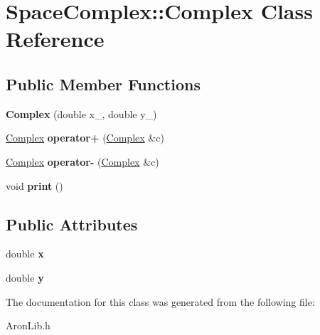 \hypertarget{class_space_complex_1_1_complex}{}\section{Space\+Complex\+:\+:Complex Class Reference}
\label{class_space_complex_1_1_complex}
\subsection*{Public Member Functions}
\begin{DoxyCompactItemize}
\item 
\mbox{\label{class_space_complex_1_1_complex_a366b06ac1e3a9e6d41494fdc91ab8e0e}} 
{\bfseries Complex} (double x\+\_\+, double y\+\_\+)
\item 
\mbox{\label{class_space_complex_1_1_complex_aea42c3fb8920152900502ef380b78225}} 
\mbox{\hyperlink{class_space_complex_1_1_complex}{Complex}} {\bfseries operator+} (\mbox{\hyperlink{class_space_complex_1_1_complex}{Complex}} \&c)
\item 
\mbox{\label{class_space_complex_1_1_complex_a50f532f1f2a7126ec9eab75b338385c5}} 
\mbox{\hyperlink{class_space_complex_1_1_complex}{Complex}} {\bfseries operator-\/} (\mbox{\hyperlink{class_space_complex_1_1_complex}{Complex}} \&c)
\item 
\mbox{\label{class_space_complex_1_1_complex_a8c0375773c39faf050f50d2979e5d31c}} 
void {\bfseries print} ()
\end{DoxyCompactItemize}
\subsection*{Public Attributes}
\begin{DoxyCompactItemize}
\item 
\mbox{\label{class_space_complex_1_1_complex_a9cda12c0bd13fe8b5193d85043e168a8}} 
double {\bfseries x}
\item 
\mbox{\label{class_space_complex_1_1_complex_a4297f745ee62818e6643e19e5dafbe0f}} 
double {\bfseries y}
\end{DoxyCompactItemize}


The documentation for this class was generated from the following file\+:\begin{DoxyCompactItemize}
\item 
Aron\+Lib.\+h\end{DoxyCompactItemize}
